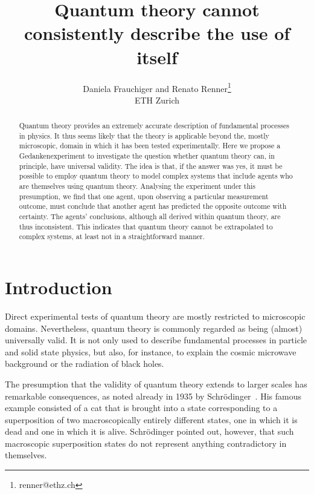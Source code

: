 \documentclass{article}
\theoremstyle{mystyle}
\theoremstyle{definition}
\begin{document}
\title{Quantum theory cannot consistently describe the use of itself}

\author{Daniela Frauchiger and Renato Renner\thanks{renner@ethz.ch} \\[1ex]
ETH Zurich}

\date{}


\maketitle

\begin{abstract}
Quantum theory provides an extremely accurate description of fundamental processes in physics. It thus seems likely that the theory is applicable beyond the, mostly microscopic, domain in which it has been tested experimentally.  Here we propose a Gedankenexperiment to investigate the question whether quantum theory can, in principle, have universal validity. The idea is that, if the answer was yes, it must be possible to employ quantum theory  to model complex systems that include agents who are themselves using quantum theory.  Analysing the experiment under this presumption, we find that one agent, upon observing a particular measurement outcome, must conclude that another agent has predicted the opposite outcome with certainty. The agents' conclusions, although all derived within quantum theory, are thus inconsistent.  This indicates that quantum theory cannot be extrapolated to complex systems, at least not in a straightforward manner.
\end{abstract}


\section{Introduction} \label{sec_intro}

Direct experimental tests of quantum theory are mostly restricted to microscopic domains. Nevertheless, quantum theory is  commonly regarded as being (almost) universally valid. It is not only used to describe fundamental processes in particle and solid state physics, but also, for instance, to explain the cosmic microwave background or the radiation of black holes. 

The presumption that the validity of quantum theory extends to larger scales has remarkable consequences, as noted already in 1935 by  Schr\"odinger~\cite{Schroedinger35}. His famous example consisted of a cat that is brought into a state corresponding to a superposition of two macroscopically entirely different states, one in which it is dead and one in which it is alive.  Schr\"odinger pointed out, however, that such macroscopic superposition states do not represent anything contradictory in themselves. 
\end{document}
